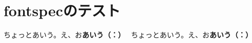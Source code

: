 \documentclass{article}
\begin{document}
\section{fontspecのテスト}

\makeatletter

ちょっとあいう。え、お\textbf{あいう（：）}
\hbox{\tate
ちょっとあいう。え、お\textbf{あいう（：）}}
\end{document}
